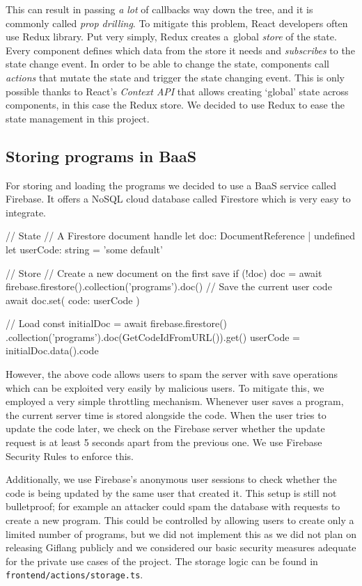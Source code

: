This can result in passing \emph{a lot} of callbacks way down the tree, and it is commonly called \emph{prop drilling}. To mitigate this problem, React developers
often use Redux library. Put very simply, Redux creates a~global \emph{store} of the state. Every component defines which data from the store it needs and
\emph{subscribes} to the state change event. In order to be able to change the state, components call \emph{actions} that mutate the state and trigger the state
changing event. This is only possible thanks to React's \emph{Context API} that allows creating `global' state across components, in this case the Redux store.
We decided to use Redux to ease the state management in this project.

\subsection{Storing programs in BaaS}
For storing and loading the programs we decided to use a BaaS service called Firebase. It offers a NoSQL cloud database called Firestore which is very easy
to integrate.
\begin{code}
// State
// A Firestore document handle
let doc: DocumentReference | undefined
let userCode: string = 'some default'

// Store
// Create a new document on the first save
if (!doc) {
    doc = await firebase.firestore().collection('programs').doc()
}
// Save the current user code
await doc.set({ code: userCode })

// Load
const initialDoc = 
    await firebase.firestore()
        .collection('programs').doc(GetCodeIdFromURL()).get()
userCode = initialDoc.data().code
\end{code}

However, the above code allows users to spam the server with save operations which can be exploited very easily by malicious users. To mitigate this, we employed a very simple
throttling mechanism. Whenever user saves a program, the current server time is stored alongside the code. When the user tries to update the code later, we check
on the Firebase server whether the update request is at least 5 seconds apart from the previous one. We use Firebase Security Rules to enforce this.

Additionally, we use Firebase's anonymous user sessions to check whether the code is being updated by the same user that created it. This setup is still not
bulletproof; for example an attacker could spam the database with requests to create a new program. This could be controlled by allowing users to create only
a limited number of programs, but we did not implement this as we did not plan on releasing Giflang publicly and we considered our basic security measures
adequate for the private use cases of the project. The storage logic can be found in \texttt{frontend/actions/storage.ts}.